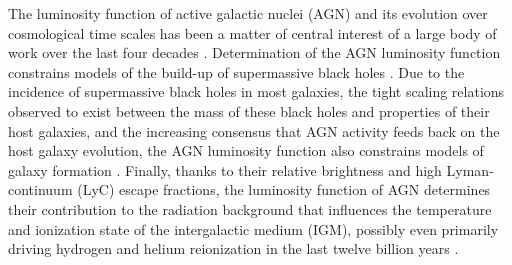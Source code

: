 \documentclass[fleqn,usenatbib]{mnras}
\begin{document}
The luminosity function of active galactic nuclei (AGN) and its
evolution over cosmological time scales has been a matter of central
interest of a large body of work over the last four decades
\citep{1968ApJ...151..393S, 1978A&A....68...17M, 1983ApJ...269..352S,
  1988ApJ...325...92K, 1988MNRAS.235..935B, 1993ApJ...406L..43H,
  1994ApJ...421..412W, 1995AJ....110...68S, 1995AJ....110.2553K,
  1995ApJ...438..623P, 2000MNRAS.317.1014B, 2001AJ....121...54F,
  2004AJ....128..515F, 2006AJ....131.2766R, 2007ApJ...654..731H,
  2009MNRAS.392...19C, 2010AJ....139..906W, 2011ApJ...728L..26G,
  2013ApJ...773...14R, 2013ApJ...768..105M, 2015AA...578A..83G,
  2015ApJ...798...28K, 2016ApJ...829...33Y, 2016ApJ...833..222J}.
Determination of the AGN luminosity function constrains models of the
build-up of supermassive black holes \citep{1982MNRAS.200..115S,
  2004ApJ...602..603Y, 2007ApJ...654..731H, 2008ApJ...679..118S,
  2009A&A...493...55E, 2000ApJ...531...42H, 2010MNRAS.401.2531A,
  2013ApJ...773...14R, 2014ApJ...787...73D, 2015MNRAS.448.3603D,
  2015MNRAS.452..575S, 2016MNRAS.462..190R}.  Due to the incidence of
supermassive black holes in most galaxies, the tight scaling relations
observed to exist between the mass of these black holes and properties
of their host galaxies, and the increasing consensus that AGN activity
feeds back on the host galaxy evolution, the AGN luminosity function
also constrains models of galaxy formation \citep{2006ApJ...650...42L,
  2008MNRAS.385.1846M}.  Finally, thanks to their relative brightness
and high Lyman-continuum (LyC) escape fractions, the luminosity
function of AGN determines their contribution to the radiation
background that influences the temperature and ionization state of the
intergalactic medium (IGM), possibly even primarily driving hydrogen
and helium reionization in the last twelve billion years
\citep{2012ApJ...746..125H, 2015AA...578A..83G, 2017ApJ...847L..15O,
  2018MNRAS.474.2904P, 2018arXiv180104931P}.
\end{document}
